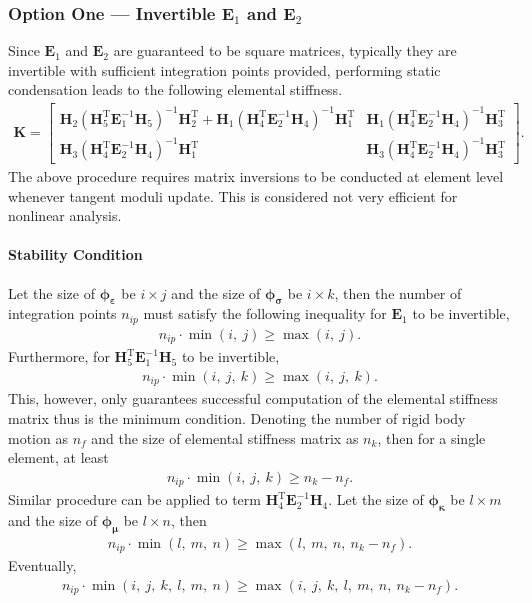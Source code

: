 \documentclass[3p,sort&compress,11pt,fleqn,review]{elsarticle}
\newcommand*{\mb}[1]{\boldsymbol{#1}}
\newcommand*{\mT}{\mathrm{T}}
\begin{document}
\subsubsection{Option One --- Invertible $\mb{E}_1$ and $\mb{E}_2$}
Since $\mb{E}_1$ and $\mb{E}_2$ are guaranteed to be square matrices, typically they are invertible with sufficient integration points provided, performing static condensation leads to the following elemental stiffness.
\begin{gather}
\mb{K}=
\begin{bmatrix}
\mb{H}_2\left(\mb{H}_5^\mT\mb{E}_1^{-1}\mb{H}_5\right)^{-1}\mb{H}_2^\mT+\mb{H}_1\left(\mb{H}_4^\mT\mb{E}_2^{-1}\mb{H}_4\right)^{-1}\mb{H}_1^\mT&\mb{H}_1\left(\mb{H}_4^\mT\mb{E}_2^{-1}\mb{H}_4\right)^{-1}\mb{H}_3^\mT\\
\mb{H}_3\left(\mb{H}_4^\mT\mb{E}_2^{-1}\mb{H}_4\right)^{-1}\mb{H}_1^\mT&\mb{H}_3\left(\mb{H}_4^\mT\mb{E}_2^{-1}\mb{H}_4\right)^{-1}\mb{H}_3^\mT
\end{bmatrix}.
\end{gather}
The above procedure requires matrix inversions to be conducted at element level whenever tangent moduli update. This is considered not very efficient for nonlinear analysis.
\paragraph{Stability Condition}
Let the size of $\mb{\phi}_{\mb{\varepsilon}}$ be $i\times{}j$ and the size of $\mb{\phi}_{\mb{\sigma}}$ be $i\times{}k$, then the number of integration points $n_{ip}$ must satisfy the following inequality for $\mb{E}_1$ to be invertible,
\begin{gather}
n_{ip}\cdot{}\min\left(i,~j\right)\geqslant{}\max\left(i,~j\right).
\end{gather}
Furthermore, for $\mb{H}_5^\mT\mb{E}_1^{-1}\mb{H}_5$ to be invertible,
\begin{gather}
n_{ip}\cdot{}\min\left(i,~j,~k\right)\geqslant{}\max\left(i,~j,~k\right).
\end{gather}
This, however, only guarantees successful computation of the elemental stiffness matrix thus is the minimum condition. Denoting the number of rigid body motion as $n_f$ and the size of elemental stiffness matrix as $n_k$, then for a single element, at least
\begin{gather}
n_{ip}\cdot{}\min\left(i,~j,~k\right)\geqslant{}n_k-n_f.
\end{gather}
Similar procedure can be applied to term $\mb{H}_4^\mT\mb{E}_2^{-1}\mb{H}_4$. Let the size of $\mb{\phi}_{\mb{\kappa}}$ be $l\times{}m$ and the size of $\mb{\phi}_{\mb{\mu}}$ be $l\times{}n$, then
\begin{gather}
n_{ip}\cdot{}\min\left(l,~m,~n\right)\geqslant{}\max\left(l,~m,~n,~n_k-n_f\right).
\end{gather}
Eventually,
\begin{gather}\label{eq:stability}
n_{ip}\cdot{}\min\left(i,~j,~k,~l,~m,~n\right)\geqslant{}\max\left(i,~j,~k,~l,~m,~n,~n_k-n_f\right).
\end{gather}
\end{document}
